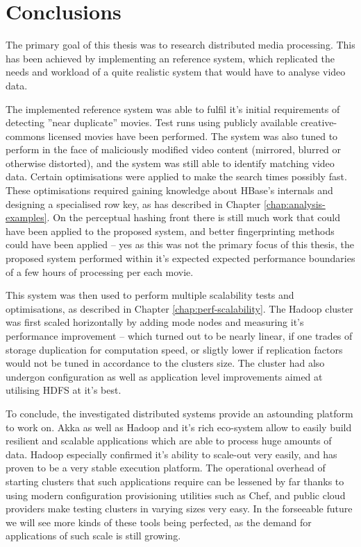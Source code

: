 \chapter{Conclusions}
\label{chap:conclusions}

The primary goal of this thesis was to research distributed media processing. This has been achieved by implementing an reference system, which replicated the needs and workload of a quite realistic system that would have to analyse video data.

The implemented reference system was able to fulfil it's initial requirements of detecting ''near duplicate'' movies. Test runs using publicly available creative-commons licensed movies have been performed. The system was also tuned to perform in the face of maliciously modified video content (mirrored, blurred or otherwise distorted), and the system was still able to identify matching video data. Certain optimisations were applied to make the search times possibly fast. These optimisations required gaining knowledge about HBase's internals and designing a specialised row key, as has described in Chapter \ref{chap:analysis-examples}. On the perceptual hashing front there is still much work that could have been applied to the proposed system, and better fingerprinting methods could have been applied -- yes as this was not the primary focus of this thesis, the proposed system performed within it's expected expected performance boundaries of a few hours of processing per each movie.

This system was then used to perform multiple scalability tests and optimisations, as described in Chapter \ref{chap:perf-scalability}. The Hadoop cluster was first scaled horizontally by adding mode nodes and measuring it's performance improvement -- which turned out to be nearly linear, if one trades of storage duplication for computation speed, or sligtly lower if replication factors would not be tuned in accordance to the clusters size. The cluster had also undergon configuration as well as application level improvements aimed at utilising HDFS at it's best.

To conclude, the investigated distributed systems provide an astounding platform to work on. Akka as well as Hadoop and it's rich eco-system allow to easily build resilient and scalable applications which are able to process huge amounts of data. Hadoop especially confirmed it's ability to scale-out very easily, and has proven to be a very stable execution platform. The operational overhead of starting clusters that such applications require can be lessened by far thanks to using modern configuration provisioning utilities such as Chef, and public cloud providers make testing clusters in varying sizes very easy. In the forseeable future we will see more kinds of these tools being perfected, as the demand for applications of such scale is still growing.